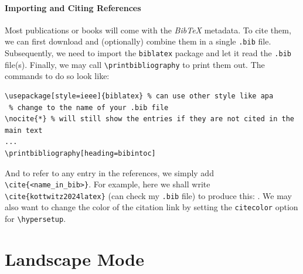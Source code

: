 \paragraph{Importing and Citing References}
Most publications or books will come with the \textit{BibTeX} metadata. To cite them, we can first download and (optionally) combine them in a single \texttt{.bib} file. Subsequently, we need to import the \texttt{biblatex} package and let it read the \texttt{.bib} file(s). Finally, we may call \texttt{\textbackslash printbibliography} to print them out. The commands to do so look like:
\begin{lstlisting}
\usepackage[style=ieee]{biblatex} % can use other style like apa
 % change to the name of your .bib file
\nocite{*} % will still show the entries if they are not cited in the main text
...
\printbibliography[heading=bibintoc]
\end{lstlisting}
And to refer to any entry in the references, we simply add \texttt{\textbackslash cite\{<name\_in\_\allowbreak bib>\}}. For example, here we shall write \texttt{\textbackslash cite\{kottwitz2024latex\}} (can check my \texttt{.bib} file) to produce this: \cite{kottwitz2024latex}. We may also want to change the color of the citation link by setting the \texttt{citecolor} option for \texttt{\textbackslash hypersetup}. 

\section{Landscape Mode}

